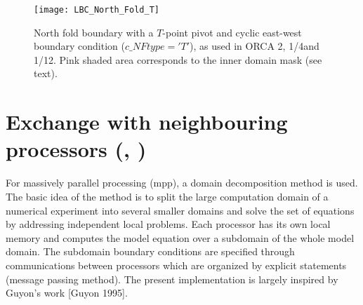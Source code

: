 \documentclass[../main/NEMO_manual]{subfiles}
\begin{document}
\begin{figure}[!t]
  \centering
  \texttt{[image: LBC\_North\_Fold\_T]}
  \caption[North fold boundary in ORCA 2\deg, 1/4\deg and 1/12\deg]{
    North fold boundary with a $T$-point pivot and cyclic east-west boundary condition ($c\_NFtype='T'$),
    as used in ORCA 2\deg, 1/4\deg and 1/12\deg.
    Pink shaded area corresponds to the inner domain mask (see text).}
  \label{fig:LBC_North_Fold_T}
\end{figure}

\section[Exchange with neighbouring processors (\textit{lbclnk.F90}, \textit{lib\_mpp.F90})]{Exchange with neighbouring processors (\protect{}, \protect{})}
\label{sec:LBC_mpp}

\begin{listing}
  \caption{}
  \label{lst:nammpp}
\end{listing}

For massively parallel processing (mpp), a domain decomposition method is used.
The basic idea of the method is to split the large computation domain of a numerical experiment into several smaller domains and
solve the set of equations by addressing independent local problems.
Each processor has its own local memory and computes the model equation over a subdomain of the whole model domain.
The subdomain boundary conditions are specified through communications between processors which are organized by
explicit statements (message passing method).
The present implementation is largely inspired by Guyon's work [Guyon 1995].
\end{document}
